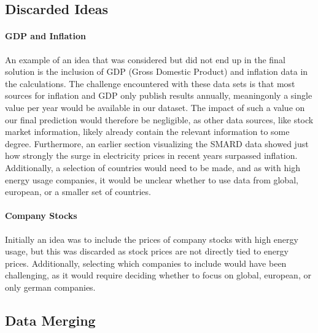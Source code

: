 \documentclass[a4paper]{article}
\begin{document}
    \subsection{Discarded Ideas}\label{discarded-ideas}

\paragraph{GDP and Inflation}\label{gdp-and-inflation}

An example of an idea that was considered but did not end up in the
final solution is the inclusion of GDP (Gross Domestic Product) and
inflation data in the calculations. The challenge encountered with these
data sets is that most sources for inflation and GDP only publish
results annually, meaningonly a single value per year would be available
in our dataset. The impact of such a value on our final prediction would
therefore be negligible, as other data sources, like stock market
information, likely already contain the relevant information to some
degree. Furthermore, an earlier section visualizing the SMARD data
showed just how strongly the surge in electricity prices in recent years
surpassed inflation. Additionally, a selection of countries would need
to be made, and as with high energy usage companies, it would be unclear
whether to use data from global, european, or a smaller set of
countries.

\paragraph{Company Stocks}\label{company-stocks}

Initially an idea was to include the prices of company stocks with high
energy usage, but this was discarded as stock prices are not directly
tied to energy prices. Additionally, selecting which companies to
include would have been challenging, as it would require deciding
whether to focus on global, european, or only german companies.

    \subsection{Data Merging}\label{data-merging}
\end{document}
